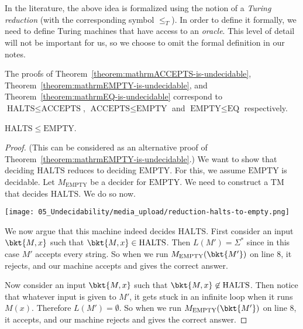 \begin{note}
\label{note:Turing-reductions}
In the literature, the above idea is formalized using the notion of a \emph{Turing reduction} (with the corresponding symbol $\leq_T$). In order to define it formally, we need to define Turing machines that have access to an \emph{oracle}. This level of detail will not be important for us, so we choose to omit the formal definition in our notes.

\end{note}

\begin{note}
\label{note:Already-established-reductions}
The proofs of Theorem~\ref{theorem:mathrmACCEPTS-is-undecidable}, Theorem~\ref{theorem:mathrmEMPTY-is-undecidable}, and Theorem~\ref{theorem:mathrmEQ-is-undecidable} correspond to $\text{HALTS} \leq \text{ACCEPTS}$, $\text{ACCEPTS} \leq \text{EMPTY}$ and $\text{EMPTY} \leq \text{EQ}$ respectively.

\end{note}

\begin{flex}
\label{grp:theorem:mathrmHALTS-leq-mathrmEMPTY}

\begin{theorem}
\label{theorem:mathrmHALTS-leq-mathrmEMPTY}
$\mathrm{HALTS} \leq \mathrm{EMPTY}$.

\end{theorem}

\begin{proof}
\label{prf:Undecidable-Languages::considered}
(This can be considered as an alternative proof of Theorem~\ref{theorem:mathrmEMPTY-is-undecidable}.) We want to show that deciding $\text{HALTS}$ reduces to deciding $\text{EMPTY}$. For this, we assume $\text{EMPTY}$ is decidable. Let $M_\text{EMPTY}$ be a decider for $\text{EMPTY}$. We need to construct a TM that decides $\text{HALTS}$. We do so now.

\begin{center}
\texttt{[image: 05\_Undecidability/media\_upload/reduction-halts-to-empty.png]}
\end{center}

We now argue that this machine indeed decides $\text{HALTS}$. First consider an input $\bkt{M,x}$ such that $\bkt{M,x} \in \text{HALTS}$. Then $L(M') = \Sigma^*$ since in this case $M'$ accepts every string. So when we run $M_\text{EMPTY}(\bkt{M'})$ on line 8, it rejects, and our machine accepts and gives the correct answer. 

Now consider an input $\bkt{M,x}$ such that $\bkt{M,x} \not \in \text{HALTS}$. Then notice that whatever input is given to $M'$, it gets stuck in an infinite loop when it runs $M(x)$. Therefore $L(M')= \emptyset$. So when we run $M_\text{EMPTY}(\bkt{M'})$ on line 8, it accepts, and our machine rejects and gives the correct answer.

\end{proof}
\end{flex}

